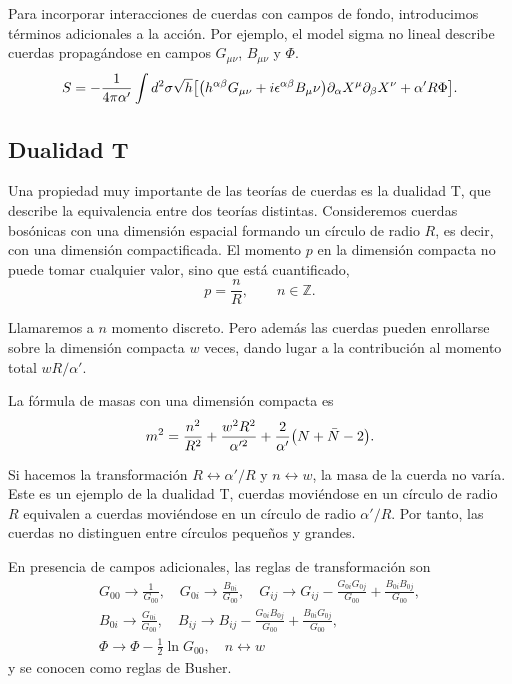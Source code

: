 
Para incorporar interacciones de cuerdas con campos de fondo, introducimos términos adicionales a la acción.
Por ejemplo, el model sigma no lineal describe cuerdas propagándose en campos $G_{\mu\nu}$, $B_{\mu\nu}$ y $\Phi$.
\begin{equation}
  S = -\frac{1}{4\pi \alpha'}\int d^2 \sigma \sqrt h \qty[\qty(h^{\alpha\beta}G_{\mu\nu} + i\epsilon^{\alpha\beta}B_\mu\nu)\partial_\alpha X^\mu
  \partial_\beta X^\nu +\alpha'R\Phi].
\end{equation}

\subsection{Dualidad T}
\label{sec:dual}
Una propiedad muy importante de las teorías de cuerdas es la dualidad T,
que describe la equivalencia entre dos teorías distintas.
Consideremos cuerdas bosónicas con una dimensión espacial formando un círculo de radio $R$,
es decir, con una dimensión compactificada.
El momento $p$ en la dimensión compacta no puede tomar cualquier valor, sino que está cuantificado,
\begin{equation}
  p = \frac{n}{R}, \qquad n \in \mathbb Z.
\end{equation}

Llamaremos a $n$ momento discreto.
Pero además las cuerdas pueden enrollarse sobre la dimensión compacta $w$ veces, dando lugar
a la contribución al momento total $wR/\alpha'$.

La fórmula de masas con una dimensión compacta es
\begin{equation}
  m^2 = \frac{n^2}{R^2} + \frac{w^2 R^2}{\alpha'^2} +\frac{2}{\alpha'}\qty(N+\bar N -2).
\end{equation}

Si hacemos la transformación $R\leftrightarrow \alpha'/R$ y $n\leftrightarrow w$, la
masa de la cuerda no varía. 
Este es un ejemplo de la dualidad T, cuerdas moviéndose en un círculo de radio $R$ equivalen
a cuerdas moviéndose en un círculo de radio $\alpha'/R$.
Por tanto, las cuerdas no distinguen entre círculos pequeños y grandes.

En presencia de campos adicionales, las reglas de transformación son
\begin{equation}
  \begin{gathered}
    G_{00}\to \frac{1}{G_{00}}, \quad G_{0i}\to \frac{B_{0i}}{G_{00}},\quad G_{ij}\to G_{ij} -\frac{G_{0i}G_{0j}}{G_{00}}+\frac{B_{0i}B_{0j}}{G_{00}}, \\
    B_{0i}\to\frac{G_{0i}}{G_{00}},\quad B_{ij}\to B_{ij}-\frac{G_{0i}B_{0j}}{G_{00}}+\frac{B_{0i}G_{0j}}{G_{00}},\\
    \Phi\to\Phi-\frac{1}{2}\ln G_{00},\quad n\leftrightarrow w
  \end{gathered}
\end{equation}
y se conocen como reglas de Busher.


